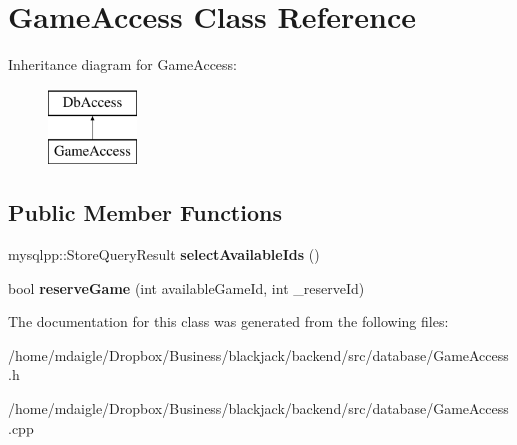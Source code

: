 \hypertarget{classGameAccess}{
\section{\-Game\-Access \-Class \-Reference}
\label{classGameAccess}
}
\-Inheritance diagram for \-Game\-Access\-:\begin{figure}[H]
\begin{center}
\leavevmode
\includegraphics[height=2.000000cm]{classGameAccess}
\end{center}
\end{figure}
\subsection*{\-Public \-Member \-Functions}
\begin{DoxyCompactItemize}
\item 
\hypertarget{classGameAccess_abd38c6664e2c64a22fdb34f075a0eb91}{
mysqlpp\-::\-Store\-Query\-Result {\bfseries select\-Available\-Ids} ()}
\label{classGameAccess_abd38c6664e2c64a22fdb34f075a0eb91}

\item 
\hypertarget{classGameAccess_a4ee316f92dac85e7e25596aaeaf92c82}{
bool {\bfseries reserve\-Game} (int available\-Game\-Id, int \-\_\-reserve\-Id)}
\label{classGameAccess_a4ee316f92dac85e7e25596aaeaf92c82}

\end{DoxyCompactItemize}


\-The documentation for this class was generated from the following files\-:\begin{DoxyCompactItemize}
\item 
/home/mdaigle/\-Dropbox/\-Business/blackjack/backend/src/database/\-Game\-Access.\-h\item 
/home/mdaigle/\-Dropbox/\-Business/blackjack/backend/src/database/\-Game\-Access.\-cpp\end{DoxyCompactItemize}
